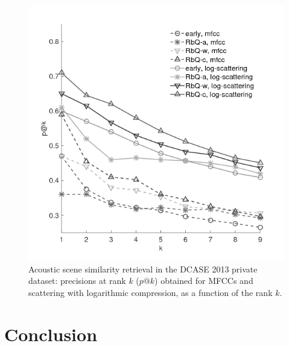 \documentclass[journal]{IEEEtran}
\begin{document}

\begin{figure}[t]
\begin{center}
\includegraphics[width=.9\columnwidth]{bw/unsupervised_test2}
\caption{Acoustic scene similarity retrieval in the DCASE 2013 private dataset: precisions at rank $k$ ($p@k$) obtained for MFCCs and scattering with logarithmic compression, as a function of the rank $k$.}
\label{fig:ASS_1}
\end{center}
\end{figure}

\section{Conclusion}
\end{document}
